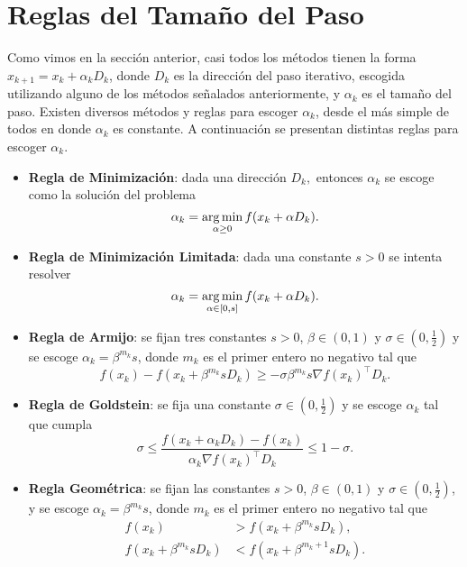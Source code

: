 \section{Reglas del Tamaño del Paso}

Como vimos en la sección anterior, casi todos los métodos tienen la forma \(x_{k+1} = x_k + \alpha_k D_k\), donde \(D_k\) es la dirección del paso iterativo, escogida utilizando alguno de los métodos señalados anteriormente, y \(\alpha_k\) es el tamaño del paso. Existen diversos métodos y reglas para escoger \(\alpha_k\), desde el más simple de todos en donde \(\alpha_k\) es constante. A continuación se presentan distintas reglas para escoger \(\alpha_k\).

\begin{itemize}
	\item \textbf{Regla de Minimización}: dada una dirección \(D_k,\) entonces \(\alpha_k\) se escoge como la solución del problema
	\begin{equation*}
	\alpha_k = \operatorname*{\arg\min}_{\alpha \geq 0} f(x_k + \alpha D_k).
	\end{equation*}
	
	\item \textbf{Regla de Minimización Limitada}: dada una constante \(s > 0\) se intenta resolver
	\begin{equation*}
	\alpha_k = \operatorname*{\arg\min}_{\alpha \in [0, s]} f(x_k + \alpha D_k).
	\end{equation*}
	
	\item \textbf{Regla de Armijo}: se fijan tres constantes \(s > 0\), \(\beta \in (0, 1)\) y \(\sigma \in (0, \frac{1}{2})\) y se escoge \(\alpha_k = \beta^{m_k} s\), donde \(m_k\) es el primer entero no negativo tal que
	\begin{equation*}
	f(x_k) - f(x_k + \beta^{m_k} s D_k) \geq -\sigma \beta^{m_k} s \nabla f(x_k)^{\top} D_k.
	\end{equation*}
	
	\item \textbf{Regla de Goldstein}: se fija una constante \(\sigma \in (0, \frac{1}{2})\) y se escoge \(\alpha_k\) tal que cumpla
	\begin{equation*}
	\sigma \leq \frac{f(x_k + \alpha_k D_k) - f(x_k)}{\alpha_k \nabla f(x_k)^{\top} D_k} \leq 1-\sigma.
	\end{equation*}
	
	\item \textbf{Regla Geométrica}: se fijan las constantes \(s > 0\), \(\beta \in (0, 1)\) y \(\sigma \in (0, \frac{1}{2})\), y se escoge \(\alpha_k = \beta^{m_k}s\), donde \(m_k\) es el primer entero no negativo tal que
	\begin{align*}
	f(x_k)						&> f(x_k + \beta^{m_k} s D_k),\\
	f(x_k + \beta^{m_k} s D_k)	&< f(x_k + \beta^{m_k + 1} s D_k).
	\end{align*}
	

\end{itemize}
